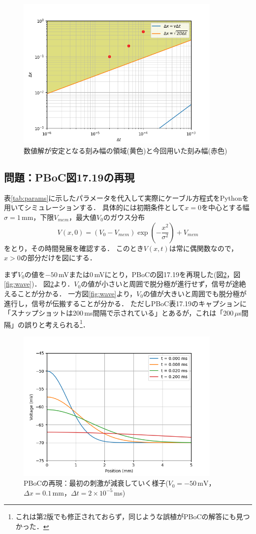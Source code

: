 \documentclass[a4paper,11pt]{jsarticle}
\begin{document}
\begin{figure}[htbp]
  \centering
  \includegraphics[width=10cm]{delta.png}
  \caption{数値解が安定となる刻み幅の領域(黄色)と今回用いた刻み幅(赤色)}
  \label{fig:delta}
\end{figure}

\subsection{問題：PBoC図17.19の再現}
表\ref{tab:params}に示したパラメータを代入して実際にケーブル方程式をPythonを用いてシミュレーションする．
具体的には初期条件として$x=0$を中心とする幅$\sigma=1$\,mm，下限$V_{mem}$，最大値$V_0$のガウス分布
\begin{equation}
  V(x,0) = (V_0 - V_{mem})\exp\left(-\frac{x^2}{\sigma^2} \right) + V_{mem}
\end{equation}
をとり，その時間発展を確認する．
このとき$V(x,t)$は常に偶関数なので，$x>0$の部分だけを図にする．

まず$V_0$の値を$-50$\,mVまたは$0$\,mVにとり，PBoCの図17.19を再現した(図\ref{fig:atte}，図\ref{fig:wave})．
図\ref{fig:atte}より．$V_0$の値が小さいと周囲で脱分極が進行せず，信号が途絶えることが分かる．
一方図\ref{fig:wave}より，$V_0$の値が大きいと周囲でも脱分極が進行し，信号が伝搬することが分かる．
ただしPBoC表17.19のキャプションに「スナップショットは200\,ms間隔で示されている」とあるが，これは「200\,$\mu$s間隔」の誤りと考えられる\footnote{これは第2版でも修正されておらず，同じような誤植がPBoCの解答にも見つかった．}．

\begin{figure}[htbp]
  \centering
  \includegraphics[width=10cm]{attenuation.png}
  \caption{PBoCの再現：最初の刺激が減衰していく様子($V_0=-50\,\mathrm{mV}$，$\Delta x=0.1$\,mm，$\Delta t = 2\times 10^{-5}$\,ms)}
  \label{fig:atte}
\end{figure}
\end{document}
